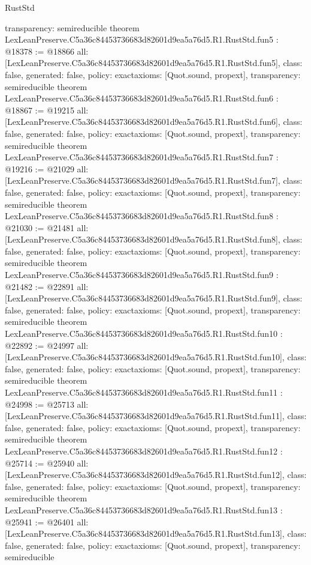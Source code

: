 \begin{lexlean}{RustStd}
\begin{coremodule}
{  transparency: semireducible
}
theorem LexLeanPreserve.C5a36c84453736683d82601d9ea5a76d5.R1.RustStd.fun5 : @18378 := @18866 {
  all: [LexLeanPreserve.C5a36c84453736683d82601d9ea5a76d5.R1.RustStd.fun5],
  class: false,
  generated: false,
  policy: exact{axioms: [Quot.sound, propext]},
  transparency: semireducible
}
theorem LexLeanPreserve.C5a36c84453736683d82601d9ea5a76d5.R1.RustStd.fun6 : @18867 := @19215 {
  all: [LexLeanPreserve.C5a36c84453736683d82601d9ea5a76d5.R1.RustStd.fun6],
  class: false,
  generated: false,
  policy: exact{axioms: [Quot.sound, propext]},
  transparency: semireducible
}
theorem LexLeanPreserve.C5a36c84453736683d82601d9ea5a76d5.R1.RustStd.fun7 : @19216 := @21029 {
  all: [LexLeanPreserve.C5a36c84453736683d82601d9ea5a76d5.R1.RustStd.fun7],
  class: false,
  generated: false,
  policy: exact{axioms: [Quot.sound, propext]},
  transparency: semireducible
}
theorem LexLeanPreserve.C5a36c84453736683d82601d9ea5a76d5.R1.RustStd.fun8 : @21030 := @21481 {
  all: [LexLeanPreserve.C5a36c84453736683d82601d9ea5a76d5.R1.RustStd.fun8],
  class: false,
  generated: false,
  policy: exact{axioms: [Quot.sound, propext]},
  transparency: semireducible
}
theorem LexLeanPreserve.C5a36c84453736683d82601d9ea5a76d5.R1.RustStd.fun9 : @21482 := @22891 {
  all: [LexLeanPreserve.C5a36c84453736683d82601d9ea5a76d5.R1.RustStd.fun9],
  class: false,
  generated: false,
  policy: exact{axioms: [Quot.sound, propext]},
  transparency: semireducible
}
theorem LexLeanPreserve.C5a36c84453736683d82601d9ea5a76d5.R1.RustStd.fun10 : @22892 := @24997 {
  all: [LexLeanPreserve.C5a36c84453736683d82601d9ea5a76d5.R1.RustStd.fun10],
  class: false,
  generated: false,
  policy: exact{axioms: [Quot.sound, propext]},
  transparency: semireducible
}
theorem LexLeanPreserve.C5a36c84453736683d82601d9ea5a76d5.R1.RustStd.fun11 : @24998 := @25713 {
  all: [LexLeanPreserve.C5a36c84453736683d82601d9ea5a76d5.R1.RustStd.fun11],
  class: false,
  generated: false,
  policy: exact{axioms: [Quot.sound, propext]},
  transparency: semireducible
}
theorem LexLeanPreserve.C5a36c84453736683d82601d9ea5a76d5.R1.RustStd.fun12 : @25714 := @25940 {
  all: [LexLeanPreserve.C5a36c84453736683d82601d9ea5a76d5.R1.RustStd.fun12],
  class: false,
  generated: false,
  policy: exact{axioms: [Quot.sound, propext]},
  transparency: semireducible
}
theorem LexLeanPreserve.C5a36c84453736683d82601d9ea5a76d5.R1.RustStd.fun13 : @25941 := @26401 {
  all: [LexLeanPreserve.C5a36c84453736683d82601d9ea5a76d5.R1.RustStd.fun13],
  class: false,
  generated: false,
  policy: exact{axioms: [Quot.sound, propext]},
  transparency: semireducible
}
\end{coremodule}
\end{lexlean}
